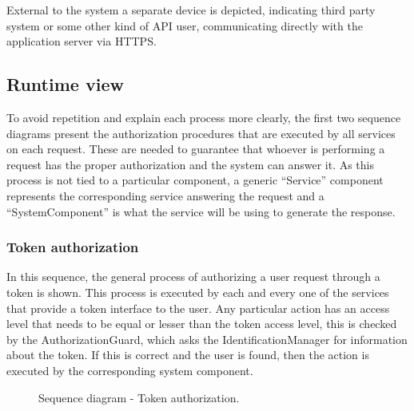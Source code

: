 External to the system a separate device is depicted, indicating third party system or some other kind of API user, communicating directly with the application server via HTTPS.

\subsection{Runtime view}
To avoid repetition and explain each process more clearly, the first two sequence diagrams present the authorization procedures that are executed by all services on each request. These are needed to guarantee that whoever is performing a request has the proper authorization and the system can answer it. 
As this process is not tied to a particular component, a generic “Service” component represents the corresponding service answering the request and a “SystemComponent” is what the service will be using to generate the response.

\subsubsection{Token authorization}
In this sequence, the general process of authorizing a user request through a token is shown. This process is executed by each and every one of the services that provide a token interface to the user. Any particular action has an access level that needs to be equal or lesser than the token access level, this is checked by the AuthorizationGuard, which asks the IdentificationManager for information about the token.
If this is correct and the user is found, then the action is executed by the corresponding system component.
\begin{figure}[H]
    \centering
    \caption{\label{fig:sequence-token-auth}Sequence diagram - Token authorization.}
\end{figure}

